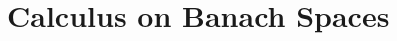\documentclass[final]{nddiss2e}
\begin{document}
\tableofcontents




\mainmatter

\appendix
\chapter{Calculus on Banach Spaces}

\end{document}
